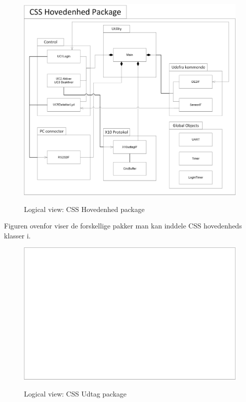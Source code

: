 \begin{figure}[!htb]
     {\includegraphics[width=\textwidth]{billeder/uml/logical_view_CSS_Hovedenhed}}
     \caption{Logical view: CSS Hovedenhed package}
     \label{fig:CSS_Hovedenhed_package}
\end{figure}

Figuren ovenfor viser de forskellige pakker man kan inddele CSS hovedenheds klasser i.

\clearpage

\begin{figure}[!htb]
     {\includegraphics[width=\textwidth]{billeder/uml/logical_view_CSS_Udtag}}
     \caption{Logical view: CSS Udtag package}
     \label{fig:CSS_Udtag_package}
\end{figure}

